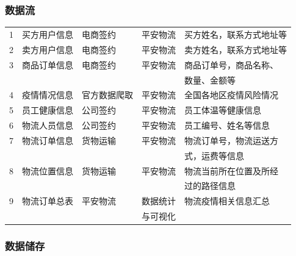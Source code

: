 \documentclass[12pt]{article}
\begin{document}
\subsubsection{数据流}

\tabletail{\bottomrule}

\begin{center}
\begin{supertabular}{lllll}
	1 & 买方用户信息 &	电商签约 &	平安物流 &	买方姓名，联系方式地址等 \\
	2 &	卖方用户信息 & 电商签约 &	平安物流 &	卖方姓名，联系方式地址等 \\
	3 &	商品订单信息 &	电商签约 &	平安物流 &	商品订单号，商品名称、 \\ &&&& 数量、金额等 \\
	4 &	疫情情况信息 &	官方数据爬取	& 平安物流 &	全国各地区疫情风险情况 \\
	5 &	员工健康信息 &	公司签约 &	平安物流 &	员工体温等健康信息 \\
	6 &	物流人员信息 &	公司签约 &	平安物流 &	员工编号、姓名等信息 \\
	7 &	物流订单信息 &	货物运输	& 平安物流 & 	物流订单号，物流运送方\\ &&&& 式，运费等信息 \\
	8 &	物流位置信息 & 货物运输 &	平安物流 &	物流当前所在位置及所经 \\ &&&& 过的路径信息 \\
	9 & 物流订单总表 & 平安物流 & 数据统计 & 物流疫情相关信息汇总 \\ &&& 与可视化 & \\
\end{supertabular}
\end{center}

\subsubsection{数据储存}

\tabletail{\bottomrule}
\end{document}

